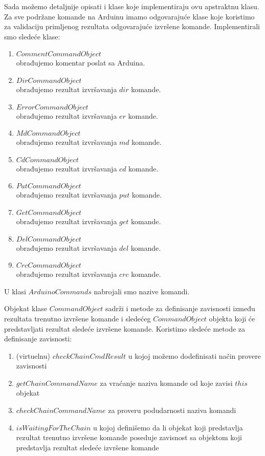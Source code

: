 \documentclass[a4paper]{extarticle}
\begin{document}
	Sada možemo detaljnije opisati i klase koje implementiraju ovu apstraktnu klasu. Za sve podržane komande na Arduinu imamo odgovarajuće klase koje koristimo za validaciju primljenog rezultata odgovarajuće izvršene komande. Implementirali smo sledeće klase:
	\begin{enumerate}
		\item $CommentCommandObject$ \\ obrađujemo komentar poslat sa Arduina.
		\item $DirCommandObject$ \\ obrađujemo rezultat izvršavanja $dir$ komande.
		\item $ErrorCommandObject$ \\obrađujemo rezultat izvršavanja $er$ komande.
		\item $MdCommandObject$ \\ obrađujemo rezultat izvršavanja $md$ komande.
		\item $CdCommandObject$ \\obrađujemo rezultat izvršavanja $cd$ komande.
		\item $PutCommandObject$ \\obrađujemo rezultat izvršavanja $put$ komande.
		\item $GetCommandObject$ \\ obrađujemo rezultat izvršavanja $get$ komande.
		\item $DelCommandObject$ \\ obrađujemo rezultat izvršavanja $del$ komande.
		\item $CrcCommandObject$ \\ obrađujemo rezultat izvršavanja $crc$ komande.
	\end{enumerate}
	
	U klasi $ArduinoCommands$ nabrojali smo nazive komandi.
	
	Objekat klase $CommandObject$ sadrži i metode za definisanje zavisnosti između rezultata trenutno izvršene komande i sledećeg $CommandObject$ objekta koji će predstavljati rezultat sledeće izvršene komande.
	Koristimo sledeće metode za definisanje zavisnosti:
	\begin{enumerate}
		\item (virtuelnu) $checkChainCmdResult$ u kojoj možemo dodefinisati način provere zavisnosti
		\item $getChainCommandName$ za vraćanje naziva komande od koje zavisi $this$ objekat
		\item $checkChainCommandName$ za proveru podudarnosti naziva komandi
		\item $isWaitingForTheChain$ u kojoj definišemo da li objekat koji predstavlja rezultat trenutno izvršene komande poseduje zavisnost sa objektom koji predstavlja rezultat sledeće izvršene komande
	\end{enumerate}
	
\end{document}

